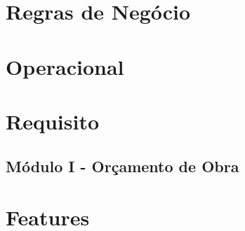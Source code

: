 \documentclass[dvips,ruledheader]{abnt}
\author{Álvaro Vilobaldo \emph{Rios}\\
Marcio \emph{Fernandes} Justino}
\begin{document}

%



\tableofcontents

\part{Regras de Negócio}











\part{Operacional}

\part{Requisito}
\chapter{Módulo I - Orçamento de Obra}



% 
% 
% 
% 
% 
% 
% 
% 

\part{Features}


% 
% 
\end{document}
